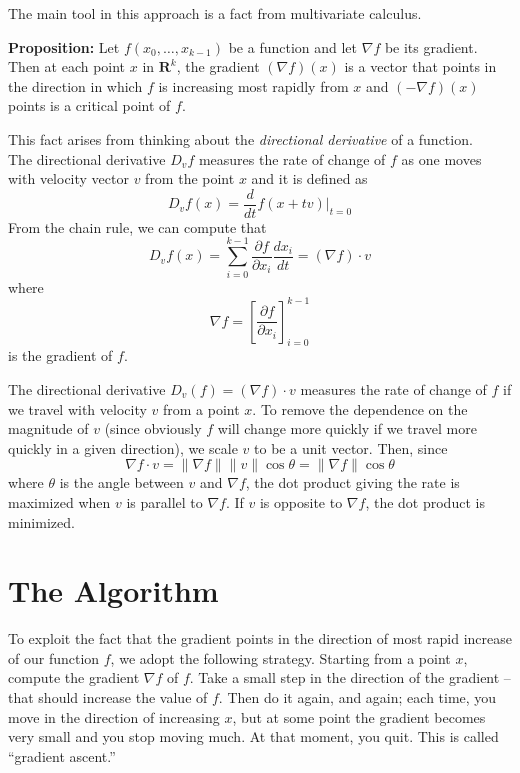 \documentclass[
  11pt,
  letterpaper,
]{scrbook}
\newcommand{\R}{\mathbf{R}}
\theoremstyle{plain}
\theoremstyle{plain}
\theoremstyle{remark}
\begin{document}
The main tool in this approach is a fact from multivariate calculus.

\textbf{Proposition:} Let \(f(x_0,\ldots, x_{k-1})\) be a function and
let \(\nabla f\) be its gradient. Then at each point \(x\) in
\(\R^{k}\), the gradient \((\nabla f)(x)\) is a vector that points in
the direction in which \(f\) is increasing most rapidly from \(x\) and
\((-\nabla f)(x)\) points is a critical point of \(f\).

This fact arises from thinking about the \emph{directional derivative}
of a function.\\
The directional derivative \(D_{v}f\) measures the rate of change of
\(f\) as one moves with velocity vector \(v\) from the point \(x\) and
it is defined as \[
D_{v}f(x) = \frac{d}{dt}f(x+tv)|_{t=0}
\] From the chain rule, we can compute that \[
D_{v}f(x) = \sum_{i=0}^{k-1} \frac{\partial f}{\partial x_{i}}\frac{dx_{i}}{dt} = (\nabla f)\cdot v
\] where \[
\nabla f = \left[\frac{\partial f}{\partial x_{i}}\right]_{i=0}^{k-1}
\] is the gradient of \(f\).

The directional derivative \(D_{v}(f)=(\nabla f)\cdot v\) measures the
rate of change of \(f\) if we travel with velocity \(v\) from a point
\(x\). To remove the dependence on the magnitude of \(v\) (since
obviously \(f\) will change more quickly if we travel more quickly in a
given direction), we scale \(v\) to be a unit vector. Then, since \[
\nabla f\cdot v=\|\nabla f\|\|v\|\cos\theta=\|\nabla f\|\cos \theta
\] where \(\theta\) is the angle between \(v\) and \(\nabla f\), the dot
product giving the rate is maximized when \(v\) is parallel to
\(\nabla f\). If \(v\) is opposite to \(\nabla f\), the dot product is
minimized.

\hypertarget{the-algorithm}{%
\section{The Algorithm}\label{the-algorithm}}

To exploit the fact that the gradient points in the direction of most
rapid increase of our function \(f\), we adopt the following strategy.
Starting from a point \(x\), compute the gradient \(\nabla f\) of \(f\).
Take a small step in the direction of the gradient -- that should
increase the value of \(f\). Then do it again, and again; each time, you
move in the direction of increasing \(x\), but at some point the
gradient becomes very small and you stop moving much. At that moment,
you quit. This is called ``gradient ascent.''
\end{document}

